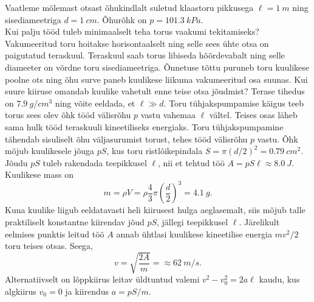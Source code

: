 
Vaatleme mõlemast otsast õhukindlalt suletud klaastoru pikkusega $\ell=\SI{1}{m}$ ning sisediameetriga $d=\SI{1}{cm}$. Õhurõhk on $p=\SI{101.3}{kPa}$.\\
\osa Kui palju tööd tuleb minimaalselt teha torus vaakumi tekitamiseks?\\
\osa Vakumeeritud toru hoitakse horisontaalselt ning selle sees ühte otsa on paigutatud teraskuul. Teraskuul saab torus libiseda hõõrdevabalt ning selle diameeter on võrdne toru sisediameetriga. Õnnetuse tõttu puruneb toru kuulikese poolne ots ning õhu surve paneb kuulikese liikuma vakumeeritud osa suunas. Kui suure kiiruse omandab kuulike vahetult enne teise otsa jõudmist? Terase tihedus on $\SI{7.9}{g/cm^3}$ ning võite eeldada, et $\ell \gg d$.\hint
Toru tühjakspumpamise käigus teeb torus sees olev õhk tööd välisrõhu $p$ vastu vahemaa $\ell$ vältel. Teises osas läheb sama hulk tööd teraskuuli kineetiliseks energiaks.\solu
\osa Toru tühjakspumpamine tähendab sisuliselt õhu väljasurumist torust, tehes tööd välisrõhu $p$ vastu. Õhk mõjub kuulikesele jõuga $pS$, kus toru ristlõikepindala $S=\pi(d/2)^2=\SI{0.79}{cm^2}$. Jõudu $pS$ tuleb rakendada teepikkusel $\ell$, nii et tehtud töö $A=pS\ell\approx\SI{8.0}{J}$. \\
\osa Kuulikese mass on
\[
m=\rho V=\rho\frac{4}{3}\pi\left(\frac{d}{2}\right)^3 = \SI{4.1}{g}.
\]
Kuna kuulike liigub eeldatavasti heli kiirusest hulga aeglasemalt, siis mõjub talle praktiliselt konstantne kiirendav jõud $pS$, jällegi teepikkusel $\ell$. Järelikult eelmises punktis leitud töö $A$ annab ühtlasi kuulikese kineetilise energia $mv^2/2$ toru teises otsas. Seega,
\[
v=\sqrt{\frac{2A}{m}} = \approx\SI{62}{m/s}.
\]
Alternatiivselt on lõppkiirus leitav üldtuntud valemi $v^2-v_0^2=2a\ell$ kaudu, kus algkiirus $v_0=0$ ja kiirendus $a=pS/m$.\probend